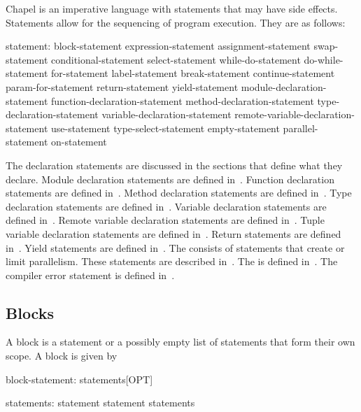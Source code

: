 \label{Statements}


Chapel is an imperative language with statements that may have side
effects.  Statements allow for the sequencing of program execution.
They are as follows:
\begin{syntax}
statement:
  block-statement
  expression-statement
  assignment-statement
  swap-statement
  conditional-statement
  select-statement
  while-do-statement
  do-while-statement
  for-statement
  label-statement
  break-statement
  continue-statement
  param-for-statement
  return-statement
  yield-statement
  module-declaration-statement
  function-declaration-statement
  method-declaration-statement
  type-declaration-statement
  variable-declaration-statement
  remote-variable-declaration-statement
  use-statement
  type-select-statement
  empty-statement
  parallel-statement
  on-statement
\end{syntax}

The declaration statements are discussed in the sections that define
what they declare.  Module declaration statements are defined
in~.  Function declaration statements are defined
in~.  Method declaration statements are defined
in~.  Type declaration statements are defined
in~.  Variable declaration statements are defined
in~.  Remote variable declaration statements are
defined in~.  Tuple variable
declaration statements are defined
in~.  Return statements are
defined in~.  Yield statements are defined
in~.  The  consists
of statements that create or limit parallelism.  These statements are
described in~.
The  is defined in~.  The compiler error
statement is defined in~.

\subsection{Blocks}
\label{Blocks}


A block is a statement or a possibly empty list of statements that
form their own scope.  A block is given by
\begin{syntax}
block-statement:
  { statements[OPT] }

statements:
  statement
  statement statements
\end{syntax}

